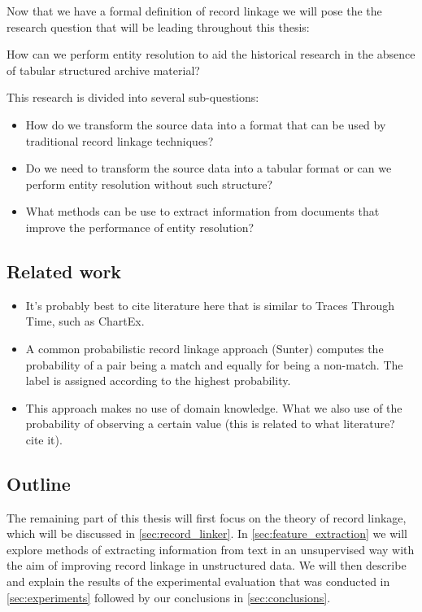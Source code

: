 Now that we have a formal definition of record linkage we will pose the the research question that will be leading throughout this thesis:

\begin{question*}
    How can we perform entity resolution to aid the historical research in the absence of tabular structured archive material?
\end{question*}

This research is divided into several sub-questions:

\begin{itemize}
    \item How do we transform the source data into a format that can be used by traditional record linkage techniques?
    \item Do we need to transform the source data into a tabular format or can we perform entity resolution without such structure?
    \item What methods can be use to extract information from documents that improve the performance of entity resolution?
\end{itemize}




\subsection{Related work}
\label{sec:related_work}

\begin{itemize}
    \item It's probably best to cite literature here that is similar to Traces Through Time, such as ChartEx.
    \item A common probabilistic record linkage approach (Sunter) computes the probability of a pair being a match and equally for being a non-match. The label is assigned according to the highest probability.
    \item This approach makes no use of domain knowledge. What we also use of the probability of observing a certain value (this is related to what literature? cite it).
\end{itemize}




\subsection{Outline}
\label{sec:outline}

The remaining part of this thesis will first focus on the theory of record linkage, which will be discussed in \cref{sec:record_linker}.
In \cref{sec:feature_extraction} we will explore methods of extracting information from text in an unsupervised way with the aim of improving record linkage in unstructured data.
We will then describe and explain the results of the experimental evaluation that was conducted in \cref{sec:experiments} followed by our conclusions in \cref{sec:conclusions}.